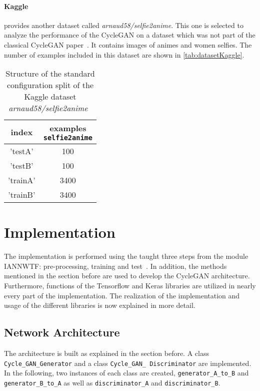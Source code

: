 \documentclass[fleqn,10pt]{SelfArx} %
\begin{document}
\paragraph{Kaggle} provides another dataset called \textit{arnaud58/selfie2anime}. This one is selected to analyze the performance of the Cycle\ac{GAN} on a dataset which was not part of the classical Cycle\ac{GAN} paper~\cite{image-to-image-ccan}. It contains images of animes and women selfies. The number of examples included in this dataset are shown in \autoref{tab:datasetKaggle}. \cite{kaggle-dataset}

\begin{table}[htb]
\centering
\caption{Structure of the standard configuration split of the Kaggle dataset \textit{arnaud58/selfie2anime}~\cite{kaggle-dataset}}
\label{tab:datasetKaggle}
\begin{tabular}{c c}
\textbf{index} & \makecell{\textbf{examples} \\ \textbf{\texttt{selfie2anime}}} \\ \hline
'testA' & 100 \\ \hline
'testB' & 100 \\ \hline
'trainA' & 3400 \\ \hline
'trainB' & 3400 \\ \hline
\end{tabular}
\end{table}
\section{Implementation}
The implementation is performed using the taught three steps from the module \ac{IANNWTF}: pre-processing, training and test~\cite{implementingANsCourseware02, implementingANsCourseware03}. In addition, the methods mentioned in the section before are used to develop the Cycle\ac{GAN} architecture. Furthermore, functions of the Tensorflow and Keras libraries are utilized in nearly every part of the implementation. The realization of the implementation and usage of the different libraries is now explained in more detail.

\subsection{Network Architecture}
The architecture is built as explained in the section before. A class \texttt{Cycle\_GAN\_Generator} and a class \texttt{Cycle\_GAN\_ Discriminator} are implemented. In the following, two instances of each class are created, \texttt{generator\_A\_to\_B} and \texttt{generator\_B\_to\_A} as well as \texttt{discriminator\_A} and \texttt{discriminator\_B}.
\end{document}
